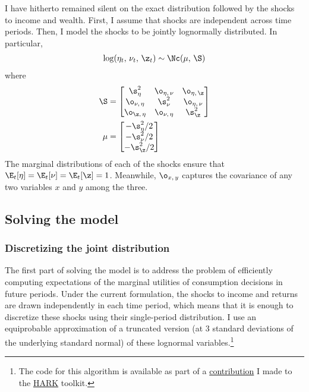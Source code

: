 I have hitherto remained silent on the exact distribution followed by the shocks to income and wealth. First, I assume that shocks are independent across time periods. Then, I model the shocks to be jointly lognormally distributed. In particular,
\begin{align*}
    \log (\eta_t,\,\nu_t,\,\z_t) \sim \Nc(\mu,\,\S)
\end{align*}
where
\begin{align*}
    \S &= \begin{bmatrix}
        \s_{\eta}^2 & \o_{\eta,\,\nu} & \o_{\eta,\,\z}\\
        \o_{\nu,\,\eta} & \s_{\nu}^2 & \o_{\eta,\,\nu}\\
        \o_{\z,\,\eta} & \o_{\nu,\,\eta} & \s_{\z}^2
    \end{bmatrix}\\
    \mu &= \begin{bmatrix}
        -\s_{\eta}^2 / 2\\
        -\s_{\nu}^2 / 2\\
        -\s_{\z}^2 / 2
    \end{bmatrix}
\end{align*}
The marginal distributions of each of the shocks ensure that $\E_t[\eta] = \E_t[\nu] = \E_t[\z] = 1$. Meanwhile, $\o_{x,\,y}$ captures the covariance of any two variables $x$ and $y$ among the three.

\subsection{Solving the model}

\subsubsection{Discretizing the joint distribution}\label{discretization}

The first part of solving the model is to address the problem of efficiently computing expectations of the marginal utilities of consumption decisions in future periods. Under the current formulation, the shocks to income and returns are drawn independently in each time period, which means that it is enough to discretize these shocks using their single-period distribution. I use an equiprobable approximation of a truncated version (at 3 standard deviations of the underlying standard normal) of these lognormal variables.\footnote{The code for this algorithm is available as part of a \href{https://github.com/econ-ark/HARK/pull/1412}{contribution} I made to the \href{https://github.com/econ-ark/HARK}{HARK} toolkit.}

